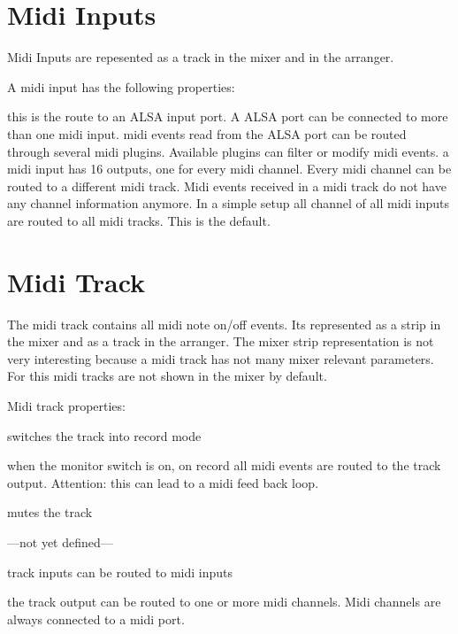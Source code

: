   \section{Midi Inputs}
      Midi Inputs are repesented as a track in the mixer and in the
      arranger.

      A midi input has the following properties:

      \blank[big]
       this is the route to an ALSA input port.
         A ALSA port can be connected to more than one midi input.
       midi events read from the ALSA port can be routed
            through several midi plugins. Available plugins can
            filter or modify midi events.
       a midi input has 16 outputs, one for every midi
            channel. Every midi channel can be routed to a different
            midi track.
            Midi events received in a midi track do not have any
            channel information anymore.
            In a simple setup all channel of all midi inputs are
            routed to all midi tracks. This is the default.

      \blank[big]

  \section{Midi Track}
      The midi track contains all midi note on/off events.
      Its represented as a strip in the mixer and as a track in the
      arranger. The mixer strip representation is not very interesting
      because a midi track has not many mixer relevant parameters.
      For this midi tracks are not shown in the mixer by default.

      Midi track properties:

      \blank[big]
       switches the track into record mode

       when the monitor switch is on, on record all
            midi events are routed to the track output.
            Attention: this can lead to a midi feed back loop.
      
       mutes the track

       ---not yet defined---

       track inputs can be routed to midi inputs

       the track output can be routed to one or more
            midi channels. Midi channels are always connected to
            a midi port.

